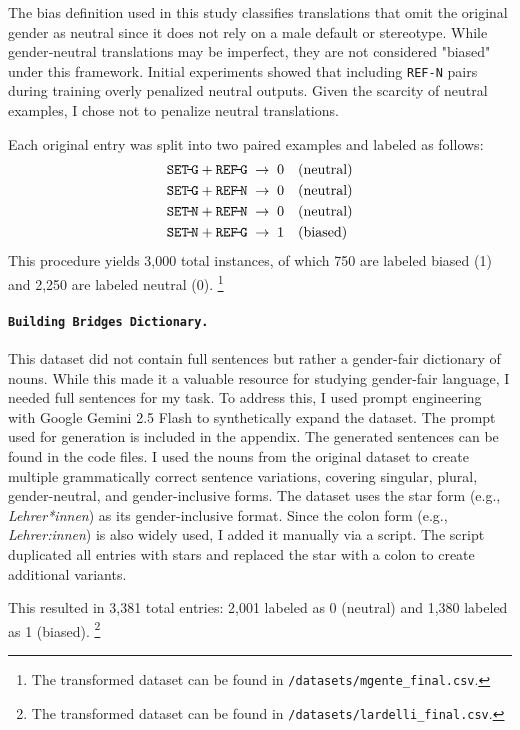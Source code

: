 \noindent
The bias definition used in this study classifies translations that omit the original gender as neutral since it does not rely on a male default or stereotype. While gender‑neutral translations may be imperfect, they are not considered "biased" under this framework. Initial experiments showed that including \texttt{REF-N} pairs during training overly penalized neutral outputs. Given the scarcity of neutral examples, I chose not to penalize neutral translations. 

Each original entry was split into two paired examples and labeled as follows:  
\[
\begin{aligned}
\texttt{SET\!-\!G} + \texttt{REF\!-\!G} &\;\rightarrow\; 0 \quad(\text{neutral})\\
\texttt{SET\!-\!G} + \texttt{REF\!-\!N} &\;\rightarrow\; 0 \quad(\text{neutral})\\
\texttt{SET\!-\!N} + \texttt{REF\!-\!N} &\;\rightarrow\; 0 \quad(\text{neutral})\\
\texttt{SET\!-\!N} + \texttt{REF\!-\!G} &\;\rightarrow\; 1 \quad(\text{biased})
\end{aligned}
\]  
This procedure yields 3,000 total instances, of which 750 are labeled biased (1) and 2,250 are labeled neutral (0). \footnote{The transformed dataset can be found in \texttt{/datasets/mgente\_final.csv}.} 


\paragraph{\texttt{Building Bridges Dictionary.}} This dataset did not contain full sentences but rather a gender-fair dictionary of nouns. While this made it a valuable resource for studying gender-fair language, I needed full sentences for my task. To address this, I used prompt engineering with Google Gemini 2.5 Flash to synthetically expand the dataset. The prompt used for generation is included in the appendix. The generated sentences can be found in the code files. I used the nouns from the original dataset to create multiple grammatically correct sentence variations, covering singular, plural, gender-neutral, and gender-inclusive forms. The dataset uses the star form (e.g., \textit{Lehrer*innen}) as its gender-inclusive format. Since the colon form (e.g., \textit{Lehrer:innen}) is also widely used, I added it manually via a script. The script duplicated all entries with stars and replaced the star with a colon to create additional variants.

This resulted in 3,381 total entries: 2,001 labeled as 0 (neutral) and 1,380 labeled as 1 (biased). \footnote{The transformed dataset can be found in \texttt{/datasets/lardelli\_final.csv}.}

